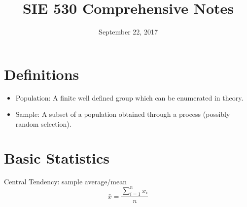 \documentclass[12pt]{article}
\begin{document}
\title{SIE 530 Comprehensive Notes}
\date{September 22, 2017}
\maketitle

\section*{Definitions}

\begin{itemize}

\item Population: A finite well defined group which can be enumerated in theory.

\item Sample: A subset of a population obtained through a process (possibly random selection). 

\end{itemize}

\newpage

\section*{Basic Statistics}

Central Tendency: sample average/mean
$$\bar{x}=\frac{\sum_{i=1}^n x_i}{n}$$
\end{document}
